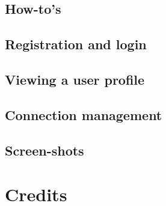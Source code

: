 \documentclass[12pt]{report}
\begin{document}
\chapter{How-to's}
\chapter{Registration and login}
\chapter{Viewing a user profile}
\chapter{Connection management}

\chapter{Screen-shots}

\part{Credits}
\end{document}
